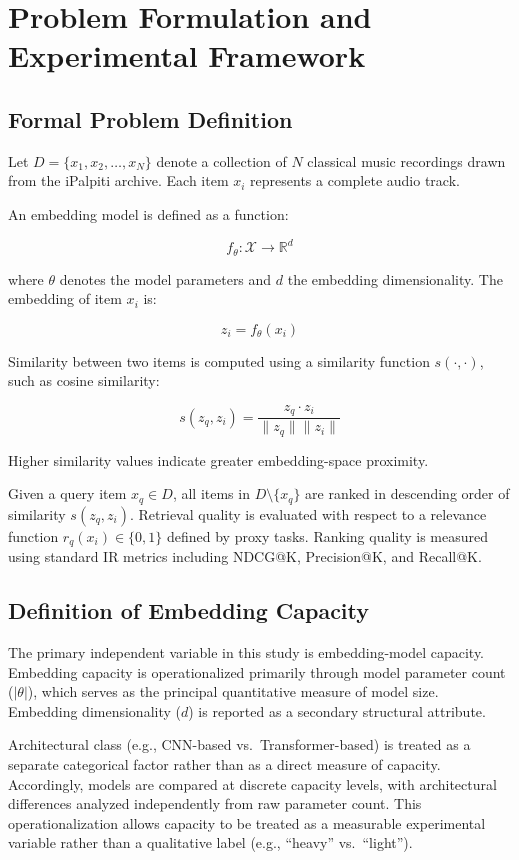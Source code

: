 \chapter{Problem Formulation and Experimental Framework}
\label{ch:problem}

\section{Formal Problem Definition}

Let $D = \{x_1, x_2, \dots, x_N\}$ denote a collection of $N$ classical music recordings drawn from the iPalpiti archive.
Each item $x_i$ represents a complete audio track.

An embedding model is defined as a function:

\[
f_\theta : \mathcal{X} \rightarrow \mathbb{R}^d
\]

where $\theta$ denotes the model parameters and $d$ the embedding dimensionality.
The embedding of item $x_i$ is:

\[
z_i = f_\theta(x_i)
\]

Similarity between two items is computed using a similarity function $s(\cdot,\cdot)$, such as cosine similarity:

\[
s(z_q, z_i) = \frac{z_q \cdot z_i}{\|z_q\|\|z_i\|}
\]

Higher similarity values indicate greater embedding-space proximity.

Given a query item $x_q \in D$, all items in $D \setminus \{x_q\}$ are ranked in descending order of similarity $s(z_q, z_i)$. 
Retrieval quality is evaluated with respect to a relevance function $r_q(x_i) \in \{0,1\}$ defined by proxy tasks.
Ranking quality is measured using standard IR metrics including NDCG@K, Precision@K, and Recall@K.



\section{Definition of Embedding Capacity}

The primary independent variable in this study is embedding-model capacity. 
Embedding capacity is operationalized primarily through model parameter count ($|\theta|$), which serves as the principal quantitative measure of model size. 
Embedding dimensionality ($d$) is reported as a secondary structural attribute.

Architectural class (e.g., CNN-based vs.\ Transformer-based) is treated as a separate categorical factor rather than as a direct measure of capacity. 
Accordingly, models are compared at discrete capacity levels, with architectural differences analyzed independently from raw parameter count. 
This operationalization allows capacity to be treated as a measurable experimental variable rather than a qualitative label (e.g., ``heavy'' vs.\ ``light'').

